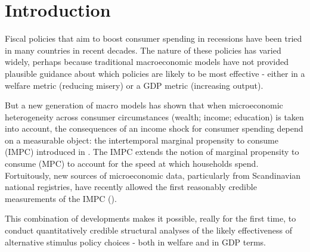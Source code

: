 \documentclass[\econtexRoot/HAFiscal]{subfiles}
\begin{document}
\hypertarget{Introduction}{}
\section{Introduction}\notinsubfile{\label{sec:intro}}
\setcounter{page}{0}

Fiscal policies that aim to boost consumer spending in recessions have been tried in many countries in recent decades.  The nature of these policies has varied widely, perhaps because traditional macroeconomic models have not provided plausible guidance about which policies are likely to be most effective - either in a welfare metric (reducing misery) or a GDP metric (increasing output).

But a new generation of macro models has shown that when microeconomic heterogeneity across consumer circumstances (wealth; income; education) is taken into account, the consequences of an income shock for consumer spending depend on a measurable object: the intertemporal marginal propensity to consume (IMPC) introduced in \cite{auclert2018IKC}.  The IMPC extends the notion of marginal propensity to consume (MPC) to account for the speed at which households spend.  Fortuitously, new sources of microeconomic data, particularly from Scandinavian national registries, have recently allowed the first reasonably credible measurements of the IMPC (\cite{fagereng_mpc_2021}).

This combination of developments makes it possible, really for the first time, to conduct quantitatively credible structural analyses of the likely effectiveness of alternative stimulus policy choices - both in welfare and in GDP terms.
\end{document}
